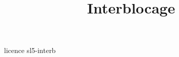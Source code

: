 \documentclass {beamer}
\title {Interblocage}
\begin{document}
 {licence}
 {sl5-interb}
\end{document}
